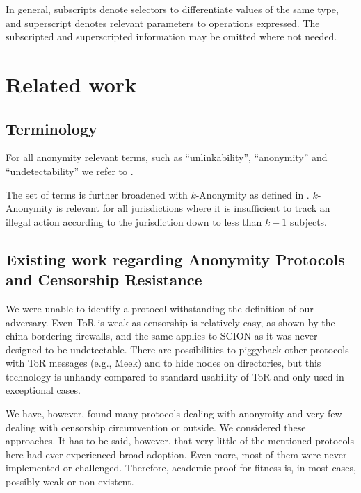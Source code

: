 \documentclass[acmsmall, screen, final]{acmart}
\begin{document}
	In general, subscripts denote selectors to differentiate values of the same type, and superscript denotes relevant parameters to operations expressed. The subscripted and superscripted information may be omitted where not needed.
	
	\section{Related work}
	\subsection{Terminology}
	For all anonymity relevant terms, such as ``unlinkability'', ``anonymity'' and ``undetectability'' we refer to \cite{anonTerminology}.
	
	The set of terms is further broadened with $k$-Anonymity as defined in \cite{k-anonymous:ccs2003}. $k$-Anonymity is relevant for all jurisdictions where it is insufficient to track an illegal action according to the jurisdiction down to less than $k-1$ subjects.
	
	\subsection{Existing work regarding Anonymity Protocols and Censorship Resistance}
	We were unable to identify a protocol withstanding the definition of our adversary. Even ToR is weak as censorship is relatively easy, as shown by the china bordering firewalls, and the same applies to SCION as it was never designed to be undetectable. There are possibilities to piggyback other protocols with ToR messages (e.g., Meek) and to hide nodes on directories, but this technology is unhandy compared to standard usability of ToR and only used in exceptional cases. 
	
	We have, however, found many protocols dealing with anonymity and very few dealing with censorship circumvention or outside. We considered these approaches. It has to be said, however, that very little of the mentioned protocols here had ever experienced broad adoption. Even more, most of them were never implemented or challenged. Therefore, academic proof for fitness is, in most cases, possibly weak or non-existent.
	
\end{document}
